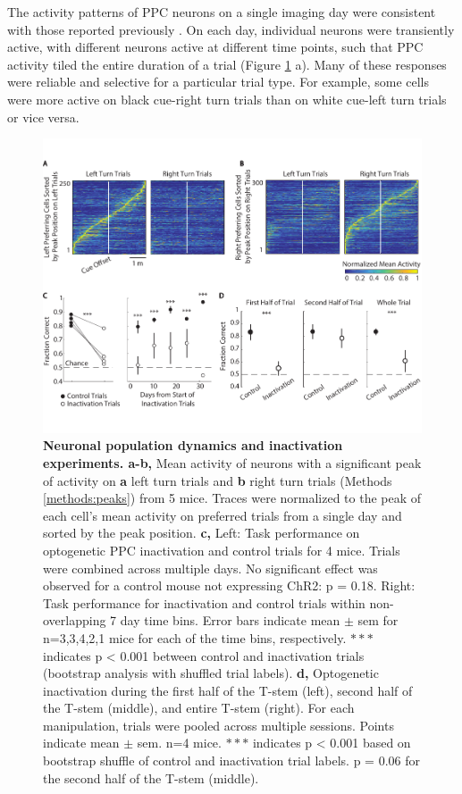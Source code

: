 The activity patterns of PPC neurons on a single imaging day were consistent with those reported previously \citep{Harvey:2012du, Morcos2016}. On each day, individual neurons were transiently active, with different neurons active at different time points, such that PPC activity tiled the entire duration of a trial (Figure \ref{fig:1_seq_inact} a). Many of these responses were reliable and selective for a particular trial type. For example, some cells were more active on black cue-right turn trials than on white cue-left turn trials or vice versa.

\begin{figure}
\includegraphics[width=\textwidth]{figures/1_seq_inact.pdf}
\caption[Neuronal population dynamics and inactivation experiments.]{\textbf{Neuronal population dynamics and inactivation experiments. a-b,} Mean activity of neurons with a significant peak of activity on \textbf{a} left turn trials and \textbf{b} right turn trials (Methods \ref{methods:peaks}) from 5 mice. Traces were normalized to the peak of each cell's mean activity on preferred trials from a single day and sorted by the peak position. 
%
\textbf{c,} Left: Task performance on optogenetic PPC inactivation and control trials for 4 mice. Trials were combined across multiple days. No significant effect was observed for a control mouse not expressing ChR2: p = 0.18. Right: Task performance for inactivation and control trials within non-overlapping 7 day time bins. Error bars indicate mean $\pm$ sem for n=3,3,4,2,1 mice for each of the time bins, respectively. $***$ indicates p < 0.001 between control and inactivation trials (bootstrap analysis with shuffled trial labels).
%
\textbf{d,} Optogenetic inactivation during the first half of the T-stem (left), second half of the T-stem (middle), and entire T-stem (right). For each manipulation, trials were pooled across multiple sessions. Points indicate mean $\pm$ sem. n=4 mice. $***$ indicates p < 0.001 based on bootstrap shuffle of control and inactivation trial labels. p = 0.06 for the second half of the T-stem (middle).
\label{fig:1_seq_inact}}
\end{figure}

